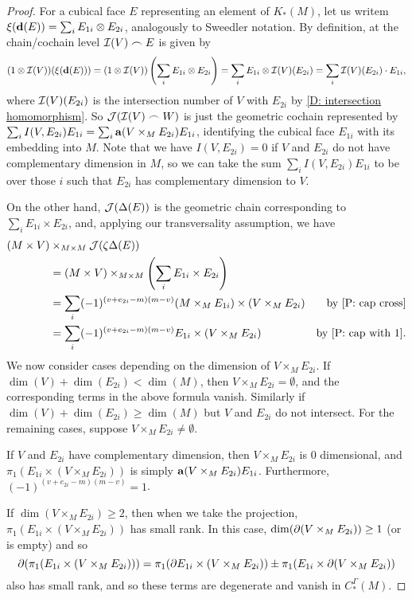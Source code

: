 \begin{proof}
	For a cubical face $E$ representing an element of $K_*(M)$, let us writem$\xi(\mathbf{d} (E)) = \sum_i E_{1i} \otimes E_{2i}$, analogously to Sweedler notation.
	By definition, at the chain/cochain level $\mathcal{I}(V)\frown E$ is given by
	$$(1 \otimes \mathcal{I}(V))(\xi(\mathbf{d} (E))) = (1 \otimes \mathcal{I}(V))\left(\sum_i E_{1i} \otimes E_{2i}\right) = \sum_i E_{1i} \otimes \mathcal{I}(V)(E_{2i}) = \sum_i \mathcal{I}(V)(E_{2i})\cdot E_{1i},$$
	where $\mathcal{I}(V)(E_{2i})$ is the intersection number of $V$ with $E_{2i}$ by \cref{D: intersection homomorphism}.
	So $\mathcal{J}(\mathcal{I}(V)\frown W)$ is just the geometric cochain represented by $\sum_i I(V,E_{2i})E_{1i} = \sum_i \mathbf{a}(V \times_M E_{2i})E_{1i} $, identifying the cubical face $E_{1i}$ with its embedding into $M$.
	Note that we have $I(V,E_{2i}) = 0$ if $V$ and $E_{2i}$ do not have complementary dimension in $M$, so we can take the sum $\sum_i I(V,E_{2i})E_{1i}$ to be over those $i$ such that $E_{2i}$ has complementary dimension to $V$.

	On the other hand, $\mathcal{J}(\Delta(E))$ is the geometric chain corresponding to $\sum_i E_{1i} \times E_{2i}$, and, applying our transversality assumption, we have
	\begin{align*}
		(M \times V)&\times_{M \times M}\mc J(\zeta\Delta(E))\\
		& = (M \times V)\times_{M \times M}\left(\sum_i E_{1i} \times E_{2i}\right)\\
		& = \sum_i (-1)^{(v+e_{2i}-m)(m-v)}(M \times_M E_{1i}) \times (V \times_M E_{2i})&\text{by \cref{P: cap cross}}\\
		& = \sum_i (-1)^{(v+e_{2i}-m)(m-v)}E_{1i} \times (V \times_M E_{2i})&\text{by \cref{P: cap with 1}}.
	\end{align*}
	We now consider cases depending on the dimension of $V \times_M E_{2i}$.
	If $\dim(V)+\dim(E_{2i})<\dim (M)$, then $V \times_M E_{2i} = \emptyset$, and the corresponding terms in the above formula vanish.
	Similarly if $\dim(V)+\dim(E_{2i})\geq \dim (M)$ but $V$ and $E_{2i}$ do not intersect.
	For the remaining cases, suppose
	$V \times_M E_{2i}\neq \emptyset$.

	If $V$ and $E_{2i}$ have complementary dimension, then $V \times_M E_{2i}$ is $0$ dimensional, and $\pi_1(
	E_{1i} \times (V \times_M E_{2i}))$ is simply $\mathbf{a}(V \times_M E_{2i})E_{1i}$.
	Furthermore, $(-1)^{(v+e_{2i}-m)(m-v)} = 1$.

	If $\dim(V \times_M E_{2i})\geq 2$, then when we take the projection,
	$\pi_1(E_{1i} \times (V \times_M E_{2i}))$ has small rank.
	In this case, $\dim(\partial (V \times_M E_{2i}))\geq 1$ (or is empty) and so
	$$\partial(\pi_1(E_{1i} \times (V \times_M E_{2i}))) = \pi_1(\partial E_{1i} \times (V \times_M E_{2i}))\pm \pi_1(E_{1i} \times \partial(V \times_M E_{2i}))$$
	also has small rank, and so these terms are degenerate and vanish in $C^\Gamma_*(M)$.


\end{proof}
